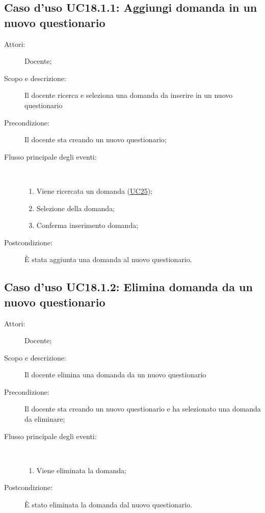 \subsection{Caso d'uso UC18.1.1: Aggiungi domanda in un nuovo questionario }\begin{description}
	\item[Attori:] Docente;
	\item[Scopo e descrizione:] Il docente ricerca e seleziona una domanda da inserire in un nuovo questionario
	\item[Precondizione:] Il docente sta creando un nuovo questionario;
	
	\item[Flusso principale degli eventi:] \ 
	\begin{enumerate}
		\item Viene ricercata un domanda (\hyperlink{UC25}{UC25});
		\item Selezione della domanda;
		\item Conferma inserimento domanda;
		
	\end{enumerate}
	\item[Postcondizione:] È stata aggiunta una domanda al nuovo questionario.
\end{description}
\hypertarget{UC18.1.2}{}
\subsection{Caso d'uso UC18.1.2: Elimina domanda da un nuovo questionario}\begin{description}
	\item[Attori:] Docente;
	\item[Scopo e descrizione:] Il docente elimina una domanda da un nuovo questionario
	\item[Precondizione:] Il docente sta creando un nuovo questionario e ha selezionato una domanda da eliminare;
	
	\item[Flusso principale degli eventi:] \ 
	\begin{enumerate}
		\item Viene eliminata la domanda;
		
	\end{enumerate}
	\item[Postcondizione:] È stato eliminata la domanda dal nuovo questionario.
\end{description}
\hypertarget{UC18.1.3}{}
